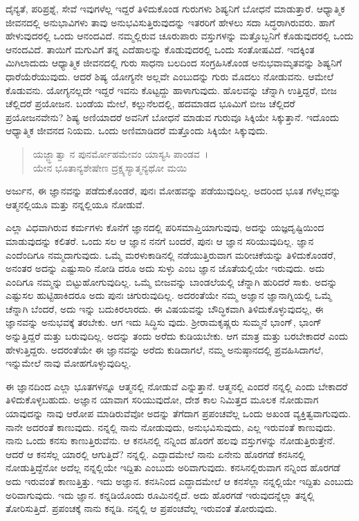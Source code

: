 ದೈನ್ಯತೆ, ಪರಿಪ್ರಶ್ನೆ, ಸೇವೆ ಇವುಗಳೆಲ್ಲ ಇದ್ದರೆ ತಿಳಿದುಕೊಂಡ ಗುರುಗಳು ಶಿಷ್ಯನಿಗೆ ಬೋಧನೆ ಮಾಡುತ್ತಾರೆ. ಆಧ್ಯಾತ್ಮಿಕ ಜೀವನದಲ್ಲಿ ಅನುಭಾವಿಗಳು ತಾವು ಅನುಭವಿಸುತ್ತಿರುವುದನ್ನು ಇತರರಿಗೆ ಹೇಳಲು ಸದಾ ಸಿದ್ಧರಾಗಿರುವರು. ಹಾಗೆ ಹೇಳುವುದರಲ್ಲಿ ಒಂದು ಆನಂದವಿದೆ. ನಮ್ಮಲ್ಲಿರುವ ಚೂರುಪಾರು ವಸ್ತುಗಳನ್ನು ಮತ್ತೊಬ್ಬನಿಗೆ ಕೊಡುವುದರಲ್ಲಿ ಒಂದು ಆನಂದವಿದೆ. ತಾಯಿಗೆ ಮಗುವಿಗೆ ತನ್ನ ಎದೆಹಾಲನ್ನು ಕೊಡುವುದರಲ್ಲಿ ಒಂದು ಸಂತೋಷವಿದೆ. ಇದಕ್ಕಿಂತ ಮಿಗಿಲಾದುದು ಆಧ್ಯಾತ್ಮಿಕ ಜೀವನದಲ್ಲಿ ಗುರು ಸಾಧನಾ ಬಲದಿಂದ ಸಂಗ್ರಹಿಸಿಕೊಂಡ ಅನುಭವಾಮೃತವನ್ನು ಶಿಷ್ಯನಿಗೆ ಧಾರೆಯೆರೆಯುವುದು. ಆದರೆ ಶಿಷ್ಯ ಯೋಗ್ಯನೇ ಅಲ್ಲವೇ ಎಂಬುದನ್ನು ಗುರು ಮೊದಲು ನೋಡುವನು. ಆಮೇಲೆ ಕೊಡುವನು. ಯೋಗ್ಯನಲ್ಲದೇ ಇದ್ದರೆ ಇವನು ಕೊಟ್ಟದ್ದು ಹಾಳಾಗುವುದು. ಹೊಲವನ್ನು ಚೆನ್ನಾಗಿ ಉತ್ತಿದ್ದರೆ, ಬೀಜ ಚೆಲ್ಲಿದರೆ ಪ್ರಯೋಜನ. ಬಂಡೆಯ ಮೇಲೆ, ಕಲ್ಲುನೆಲದಲ್ಲಿ, ಹದಮಾಡದ ಭೂಮಿಗೆ ಬೀಜ ಚೆಲ್ಲಿದರೆ ಪ್ರಯೋಜನವೇನು? ಶಿಷ್ಯ ಅಣಿಯಾದರೆ ಅವನಿಗೆ ಬೋಧನೆ ಮಾಡುವ ಗುರುವೂ ಸಿಕ್ಕಿಯೇ ಸಿಕ್ಕುತ್ತಾನೆ. ಇದೊಂದು ಆಧ್ಯಾತ್ಮಿಕ ಜೀವನದ ನಿಯಮ. ಒಂದು ಅಣಿಮಾಡಿದರೆ ಮತ್ತೊಂದು ಸಿಕ್ಕಿಯೇ ಸಿಕ್ಕುವುದು.

\begin{verse}
ಯಜ್ಜ್ಞಾತ್ವಾ ನ ಪುನರ್ಮೋಹಮೇವಂ ಯಾಸ್ಯಸಿ ಪಾಂಡವ~।\\ಯೇನ ಭೂತಾನ್ಯಶೇಷೇಣ ದ್ರಕ್ಷ್ಯಸ್ಯಾತ್ಮನ್ಯಥೋ ಮಯಿ 
\end{verse}

{\small ಅರ್ಜುನ, ಈ ಜ್ಞಾನವನ್ನು ಪಡೆದುಕೊಂಡರೆ, ಪುನಃ ಮೋಹವನ್ನು ಪಡೆಯುವುದಿಲ್ಲ. ಅದರಿಂದ ಭೂತ ಗಳೆಲ್ಲವನ್ನು ಆತ್ಮನಲ್ಲಿಯೂ ಮತ್ತು ನನ್ನಲ್ಲಿಯೂ ನೋಡುವೆ.}

ಎಲ್ಲಾ ವಿಧವಾಗಿರುವ ಕರ್ಮಗಳು ಕೊನೆಗೆ ಜ್ಞಾನದಲ್ಲಿ ಪರಿಸಮಾಪ್ತಿಯಾಗುವುವು, ಅದನ್ನು ಯಜ್ಞದೃಷ್ಟಿಯಿಂದ ಮಾಡುವುದನ್ನು ಕಲಿತರೆ. ಒಂದು ಸಲ ಆ ಜ್ಞಾನ ನನಗೆ ಬಂದರೆ, ಪುನಃ ಆ ಜ್ಞಾನ ಸರಿಯುವುದಿಲ್ಲ. ಜ್ಞಾನ ಎಂದೆಂದಿಗೂ ನಮ್ಮದಾಗುವುದು. ಒಮ್ಮೆ ಮರಳುಕಾಡಿನಲ್ಲಿ ನಡೆಯುತ್ತಿರುವಾಗ ಮರೀಚಿಕೆಯನ್ನು ತಿಳಿದುಕೊಂಡರೆ, ಅನಂತರ ಅದನ್ನು ಎಷ್ಟುಸಾರಿ ನೋಡಿ ದರೂ ಅದು ಸುಳ್ಳು ಎಂಬ ಜ್ಞಾನ ಜೊತೆಯಲ್ಲಿಯೇ ಇರುವುದು. ಅದು ಎಂದಿಗೂ ನಮ್ಮನ್ನು ಬಿಟ್ಟುಹೋಗುವುದಿಲ್ಲ. ಒಮ್ಮೆ ಬೀಜವನ್ನು ಬಾಂಡಲೆಯಲ್ಲಿ ಚೆನ್ನಾಗಿ ಹುರಿದರೆ ಸಾಕು. ಅದನ್ನು ಎಷ್ಟುಸಲ ಹುಟ್ಟಿಹಾಕಿದರೂ ಅದು ಪುನಃ ಚಿಗುರುವುದಿಲ್ಲ. ಅದರಂತೆಯೇ ನಮ್ಮ ಅಜ್ಞಾನ ಜ್ಞಾನಾಗ್ನಿಯಲ್ಲಿ ಒಮ್ಮೆ ಚೆನ್ನಾಗಿ ಬೆಂದರೆ, ಅದು ಇನ್ನು ಬದುಕಿರಲಾರದು. ಈ ವಿಷಯವನ್ನು ಬೌದ್ಧಿಕವಾಗಿ ತಿಳಿದುಕೊಳ್ಳುವುದಲ್ಲ, ಈ ಜ್ಞಾನವನ್ನು ಅನುಭವಕ್ಕೆ ತರಬೇಕು. ಆಗ ಇದು ಸಿದ್ಧಿಸು ವುದು. ಶ‍್ರೀರಾಮಕೃಷ್ಣರು ಸುಮ್ಮನೆ ಭಾಂಗ್, ಭಾಂಗ್ ಅನ್ನುತ್ತಿದ್ದರೆ ಮತ್ತು ಬರುವುದಿಲ್ಲ. ಅದನ್ನು ತಂದು ಅರೆದು ಕುಡಿಯಬೇಕು. ಆಗ ಮಾತ್ರ ಮತ್ತು ಬರಬೇಕಾದರೆ ಎಂದು ಹೇಳುತ್ತಿದ್ದರು. ಅದರಂತೆಯೇ ಈ ಜ್ಞಾನವನ್ನು ಅರೆದು ಕುಡಿದಾಗಲೆ, ನಮ್ಮ ಅನುಷ್ಠಾನದಲ್ಲಿ ಪ್ರವಹಿಸಿದಾಗಲೆ, ಇನ್ನುಮೇಲೆ ನಾವು ಮೋಹಗೊಳ್ಳುವುದಿಲ್ಲ.

ಈ ಜ್ಞಾನದಿಂದ ಎಲ್ಲಾ ಭೂತಗಳನ್ನೂ ಆತ್ಮನಲ್ಲಿ ನೋಡುವೆ ಎನ್ನುತ್ತಾನೆ. ಆತ್ಮನಲ್ಲಿ ಎಂದರೆ ನನ್ನಲ್ಲಿ ಎಂದು ಬೇಕಾದರೆ ತಿಳಿದುಕೊಳ್ಳಬಹುದು. ಅಜ್ಞಾನ ಯಾವಾಗ ಸರಿಯುವುದೋ, ದೇಶ ಕಾಲ ನಿಮಿತ್ತದ ಮೂಲಕ ನೋಡುವಾಗ ಯಾವುದನ್ನು ನಾವು ಆರೋಪ ಮಾಡಿರುವೆವೋ ಅದನ್ನು ತೆಗೆದಾಗ ಪ್ರಪಂಚವೆಲ್ಲ ಒಂದು ಅಖಂಡ ವ್ಯಕ್ತಿತ್ವವಾಗುವುದು. ನಾನೇ ಅದರಂತೆ ಕಾಣುವುದು. ನನ್ನಲ್ಲಿ ನಾನು ನೋಡುವುದು, ಅನುಭವಿಸುವುದು, ಎಲ್ಲ ಇರುವಂತೆ ಕಾಣುವುದು. ನಾನು ಒಂದು ಕನಸು ಕಾಣುತ್ತಿರುವೆನು. ಆ ಕನಸಿನಲ್ಲಿ ನನ್ನಿಂದ ಹೊರಗೆ ಹಲವು ವಸ್ತುಗಳನ್ನು ನೋಡುತ್ತಿರುತ್ತೇನೆ. ಆದರೆ ಆ ಕನಸೆಲ್ಲ ಯಾರಲ್ಲಿ ಆಗುತ್ತಿದೆ? ನನ್ನಲ್ಲಿ. ಎದ್ದಾದಮೇಲೆ ನಾನು ಏನೇನು ಹೊರಗಡೆ ಕನಸಿನಲ್ಲಿ ನೋಡುತ್ತಿದ್ದೆನೋ ಅದೆಲ್ಲ ನನ್ನಲ್ಲಿಯೇ ಇದ್ದಿತು ಎಂಬುದು ಅರಿವಾಗುವುದು. ಕನಸಿನಲ್ಲಿರುವಾಗ ನನ್ನಿಂದ ಹೊರಗಡೆ ಅದು ಇರುವಂತೆ ಕಾಣುತ್ತಿತ್ತು. ಇದು ಅಜ್ಞಾನ. ಕನಸಿನಿಂದ ಎದ್ದಾದಮೇಲೆ ಆ ಕನಸೆಲ್ಲಾ ನನ್ನಲ್ಲಿಯೇ ಇದ್ದಿತು ಎಂಬುದು ಅರಿವಾಗುವುದು. ಇದು ಜ್ಞಾನ. ಕನ್ನಡಿಯೊಂದು ರೂಮಿನಲ್ಲಿದೆ. ಅದು ಹೊರಗಡೆ ಇರುವುದನ್ನೆಲ್ಲಾ ತನ್ನಲ್ಲಿ ತೋರಿಸುತ್ತಿದೆ. ಪ್ರಪಂಚಕ್ಕೆ ನಾನು ಕನ್ನಡಿ. ನನ್ನಲ್ಲಿ ಆ ಪ್ರಪಂಚವೆಲ್ಲ ಇರುವಂತೆ ತೋರುವುದು.

